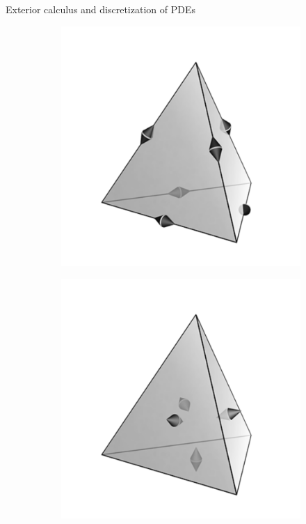 \documentclass{beamer}
\begin{document}
\begin{frame}{Exterior calculus and discretization of PDEs}
\begin{figure}[t]
\begin{subfigure}[t]{0.23\textwidth}
			\includegraphics[width=\columnwidth]{N1e1_tetrahedron.pdf}%
		\end{subfigure}\hfill
		\begin{subfigure}[t]{0.23\textwidth}
			\includegraphics[width=\columnwidth]{N1f1_tetrahedron.pdf}%

\end{subfigure}
\end{figure}
\end{frame}
\end{document}
